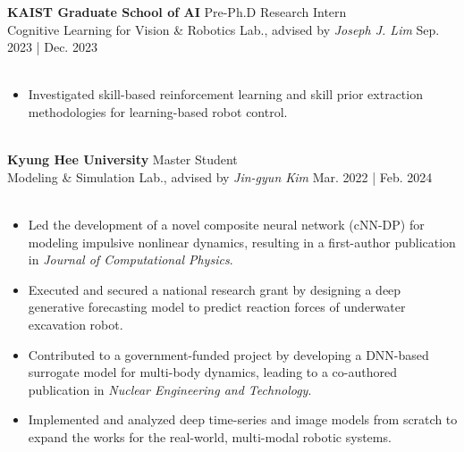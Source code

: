 \documentclass[a4paper,10pt]{extarticle}
\begin{document}

\noindent\textbf{KAIST Graduate School of AI} \hfill Pre-Ph.D Research Intern\\
Cognitive Learning for Vision \& Robotics Lab., advised by \textsl{Joseph J. Lim} \hfill Sep. 2023 | Dec. 2023\\
\vspace*{-0.25cm}\\
\begin{minipage}{0.75\textwidth}
	\small
	\begin{itemize}
		\item Investigated skill-based reinforcement learning and skill prior extraction methodologies for learning-based robot control.
	\end{itemize}
\end{minipage}\\


\noindent\textbf{Kyung Hee University} \hfill Master Student\\
Modeling \& Simulation Lab., advised by \textsl{Jin-gyun Kim} \hfill Mar. 2022 | Feb. 2024\\
\vspace*{-0.25cm}\\
\begin{minipage}{0.75\textwidth}
	\small
	\begin{itemize}
		\item Led the development of a novel composite neural network (cNN-DP) for modeling impulsive nonlinear dynamics, resulting in a first-author publication in \textit{Journal of Computational Physics}.
		\item Executed and secured a national research grant by designing a deep generative forecasting model to predict reaction forces of underwater excavation robot.
		\item Contributed to a government-funded project by developing a DNN-based surrogate model for multi-body dynamics, leading to a co-authored publication in \textit{Nuclear Engineering and Technology}.
		\item Implemented and analyzed deep time-series and image models from scratch to expand the works for the real-world, multi-modal robotic systems.
	\end{itemize}
\end{minipage}\\
\end{document}
